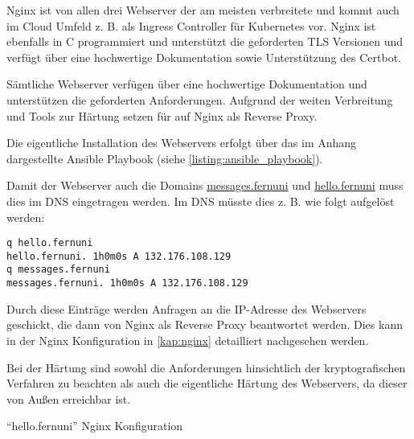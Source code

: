 Nginx ist von allen drei Webserver der am meisten verbreitete und kommt auch im Cloud Umfeld z. B. als Ingress Controller für Kubernetes vor. Nginx ist ebenfalls in C programmiert und unterstützt die geforderten \ac{TLS} Versionen und verfügt über eine hochwertige Dokumentation sowie Unterstützung des Certbot.

Sämtliche Webserver verfügen über eine hochwertige Dokumentation und unterstützen die geforderten Anforderungen. Aufgrund der weiten Verbreitung und Tools zur Härtung setzen für auf Nginx als Reverse Proxy.

Die eigentliche Installation des Webservers erfolgt über das im Anhang dargestellte Ansible Playbook (siehe \autoref{listing:ansible_playbook}).

Damit der Webserver auch die Domains \url{messages.fernuni} und \url{hello.fernuni} muss dies im \ac*{DNS} eingetragen werden. Im \ac{DNS} müsste dies z. B. wie folgt aufgelöst werden:

\begin{verbatim}
q hello.fernuni
hello.fernuni. 1h0m0s A 132.176.108.129
q messages.fernuni
messages.fernuni. 1h0m0s A 132.176.108.129
\end{verbatim}

Durch diese Einträge werden Anfragen an die IP-Adresse des Webservers geschickt, die dann von Nginx als Reverse Proxy beantwortet werden. Dies kann in der Nginx Konfiguration in \autoref{kap:nginx} detailliert nachgesehen werden.

Bei der Härtung sind sowohl die Anforderungen hinsichtlich der kryptografischen Verfahren zu beachten als auch die eigentliche Härtung des Webservers, da dieser von Außen erreichbar ist.




\begin{listing}[ht]
    \caption{\enquote{hello.fernuni} Nginx Konfiguration}
    \label{listing:nginx_config_hello}
\end{listing}

